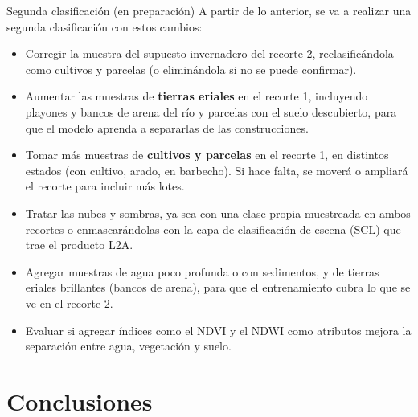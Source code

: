 \documentclass[11pt,letterpaper]{article}
\begin{document}
\begin{analisisBox}{Segunda clasificación (en preparación)}
A partir de lo anterior, se va a realizar una segunda clasificación con estos cambios:
\begin{itemize}
    \item Corregir la muestra del supuesto invernadero del recorte 2, reclasificándola como cultivos y
    parcelas (o eliminándola si no se puede confirmar).
    \item Aumentar las muestras de \textbf{tierras eriales} en el recorte 1, incluyendo playones y bancos de
    arena del río y parcelas con el suelo descubierto, para que el modelo aprenda a separarlas de las
    construcciones.
    \item Tomar más muestras de \textbf{cultivos y parcelas} en el recorte 1, en distintos estados (con
    cultivo, arado, en barbecho). Si hace falta, se moverá o ampliará el recorte para incluir más lotes.
    \item Tratar las nubes y sombras, ya sea con una clase propia muestreada en ambos recortes o
    enmascarándolas con la capa de clasificación de escena (SCL) que trae el producto L2A.
    \item Agregar muestras de agua poco profunda o con sedimentos, y de tierras eriales brillantes (bancos de
    arena), para que el entrenamiento cubra lo que se ve en el recorte 2.
    \item Evaluar si agregar índices como el NDVI y el NDWI como atributos mejora la separación entre
    agua, vegetación y suelo.
\end{itemize}
\end{analisisBox}

\section{Conclusiones}
\end{document}
